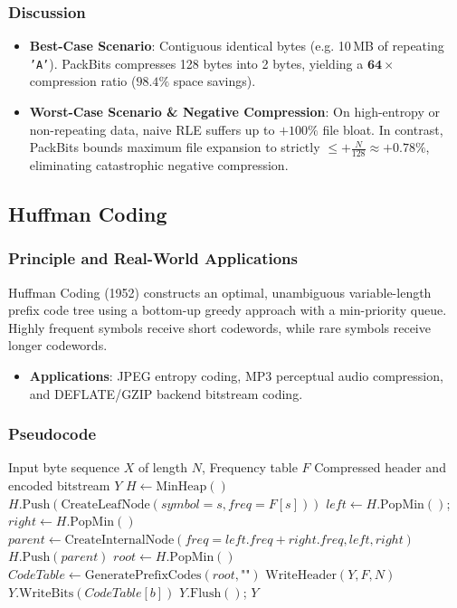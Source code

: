 \documentclass[12pt,a4paper]{article}
\begin{document}
\subsubsection{Discussion}
\begin{itemize}
    \item \textbf{Best-Case Scenario}: Contiguous identical bytes (e.g. 10\,MB of repeating \texttt{'A'}). PackBits compresses 128 bytes into 2 bytes, yielding a $\mathbf{64\times}$ compression ratio ($98.4\%$ space savings).
    \item \textbf{Worst-Case Scenario \& Negative Compression}: On high-entropy or non-repeating data, naive RLE suffers up to $+100\%$ file bloat. In contrast, PackBits bounds maximum file expansion to strictly $\le +\frac{N}{128} \approx +\mathbf{0.78\%}$, eliminating catastrophic negative compression.
\end{itemize}

\subsection{Huffman Coding}

\subsubsection{Principle and Real-World Applications}
Huffman Coding (1952) constructs an optimal, unambiguous variable-length prefix code tree using a bottom-up greedy approach with a min-priority queue. Highly frequent symbols receive short codewords, while rare symbols receive longer codewords.
\begin{itemize}
    \item \textbf{Applications}: JPEG entropy coding, MP3 perceptual audio compression, and DEFLATE/GZIP backend bitstream coding.
\end{itemize}

\subsubsection{Pseudocode}
\begin{algorithm}[H]
\caption{Huffman Tree Construction and Bitstream Encoding}
\begin{algorithmic}[1]
\Require Input byte sequence $X$ of length $N$, Frequency table $F$
\Ensure Compressed header and encoded bitstream $Y$
\State $H \gets \text{MinHeap}()$
    \State $H.\text{Push}(\text{CreateLeafNode}(symbol = s, freq = F[s]))$
\EndFor
{}
    \State $left \gets H.\text{PopMin}()$; $right \gets H.\text{PopMin}()$
    \State $parent \gets \text{CreateInternalNode}(freq = left.freq + right.freq, left, right)$
    \State $H.\text{Push}(parent)$
\EndWhile
\State $root \gets H.\text{PopMin}()$
\State $CodeTable \gets \text{GeneratePrefixCodes}(root, \text{""})$
\State $\text{WriteHeader}(Y, F, N)$
    \State $Y.\text{WriteBits}(CodeTable[b])$
\EndFor
\State $Y.\text{Flush}()$; \Return $Y$
\end{algorithmic}
\end{algorithm}
\end{document}
